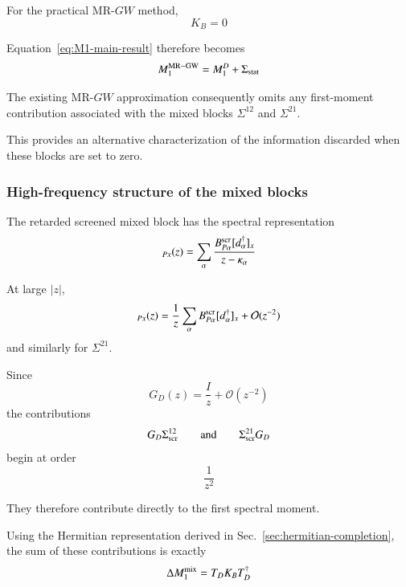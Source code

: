 \documentclass[aip,jcp,reprint,noshowkeys,superscriptaddress]{revtex4-1}
\begin{document}
For the practical MR-$GW$ method,
\begin{equation}
  K_B=0
\end{equation}

Equation~\eqref{eq:M1-main-result} therefore becomes
\begin{equation}
  M_1^{\rm MR-GW}
  =
  M_1^D
  +
  \Sigma_{\rm stat}
  \label{eq:M1-existing-MRGW}
\end{equation}

The existing MR-$GW$ approximation consequently omits any
first-moment contribution associated with the mixed blocks
$\Sigma^{12}$ and $\Sigma^{21}$.

This provides an alternative characterization of the information
discarded when these blocks are set to zero.


\subsubsection{High-frequency structure of the mixed blocks}

The retarded screened mixed block has the spectral representation
\begin{equation}
  [\Sigma_{\rm scr}^{12,R}]_{Px}(z)
  =
  \sum_\alpha
  \frac{
    B_{P\alpha}^{\rm scr}
    [d_\alpha^\dagger]_x
  }{
    z-\kappa_\alpha
  }
\end{equation}

At large $|z|$,
\begin{equation}
  [\Sigma_{\rm scr}^{12,R}]_{Px}(z)
  =
  \frac{1}{z}
  \sum_\alpha
  B_{P\alpha}^{\rm scr}
  [d_\alpha^\dagger]_x
  +
  \mathcal O(z^{-2})
\end{equation}
and similarly for $\Sigma^{21}$.

Since
\begin{equation}
  G_D(z)
  =
  \frac{I}{z}
  +
  \mathcal O(z^{-2})
\end{equation}
the contributions
\begin{equation}
  G_D\Sigma^{12}_{\rm scr}
  \qquad\text{and}\qquad
  \Sigma^{21}_{\rm scr}G_D
\end{equation}
begin at order
\begin{equation}
  \frac{1}{z^2}
\end{equation}

They therefore contribute directly to the first spectral moment.

Using the Hermitian representation derived in Sec.~\ref{sec:hermitian-completion}, the sum of these
contributions is exactly
\begin{equation}
  \Delta M_1^{\rm mix}
  =
  T_DK_BT_D^\dagger
  \label{eq:M1-mixed-contribution}
\end{equation}
\end{document}
